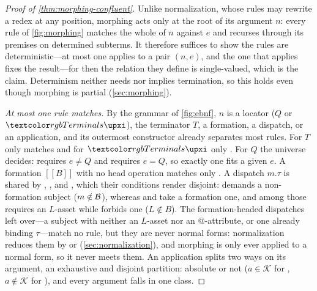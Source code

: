 
\begin{proof}[Proof of \cref{thm:morphing-confluent}]
Unlike normalization, whose rules may rewrite a redex at any position, morphing
  acts only at the root of its argument \(n\): every rule of \cref{fig:morphing}
  matches the whole of \(n\) against \(e\) and recurses through its premises on
  determined subterms.
It therefore suffices to show the rules are deterministic---at most one applies to
  a pair \((n, e)\), and the one that applies fixes the result---for then the
  relation they define is single-valued, which is the claim.
Determinism neither needs nor implies termination, so this holds even though
  morphing is partial (\cref{sec:morphing}).

\emph{At most one rule matches.}
By the grammar of \cref{fig:ebnf}, \(n\) is a locator ($Q$ or \(\phiTerminal{\upxi}\)),
  the terminator $T$, a formation, a dispatch, or an application, and its outermost
  constructor already separates most rules.
For $T$ only  matches and for \(\phiTerminal{\upxi}\) only
  .
For $Q$ the universe decides:  requires $e \neq Q$ and
   requires $e = Q$, so exactly one fits a given \(e\).
A formation $[[ B ]]$ with no head operation matches only .
A dispatch $m.\tau$ is shared by , , and
  , which their conditions render disjoint:  demands a
  non-formation subject (\(m \notin \mathcal{B}\)), whereas  and
   take a formation one, and among those  requires an
  $L$-asset while  forbids one ($L \notin B$).
The formation-headed dispatches left over---a subject with neither an $L$-asset nor
  an $@$-attribute, or one already binding \(\tau\)---match no rule, but they are
  never normal forms: normalization reduces them by  or
   (\cref{sec:normalization}), and morphing is only ever applied to a
  normal form, so it never meets them.
An application splits two ways on its argument, an exhaustive and disjoint
  partition: absolute or not (\(a \in \mathcal{K}\) for ,
  \(a \notin \mathcal{K}\) for ), and every argument falls in
  one class.


\end{proof}
